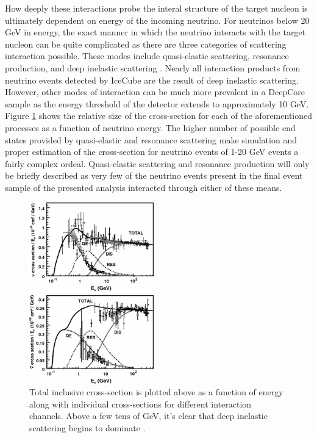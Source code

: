 \documentclass{gatech-thesis}
\begin{document}
How deeply these interactions probe the interal structure of the target nucleon is ultimately dependent on energy of the incoming neutrino. For neutrinos below 20 GeV in energy, the exact manner in which the neutrino interacts with the target nucleon can be quite complicated as there are three categories of scattering interaction possible. These modes include quasi-elastic scattering, resonance production, and deep inelastic scattering \cite{2012RvMP...84.1307F}. Nearly all interaction products from neutrino events detected by IceCube are the result of deep inelastic scattering. However, other modes of interaction can be much more prevalent in a DeepCore sample as the energy threshold of the detector extends to approximately 10 GeV. Figure \ref{fig:neutrino_scattering} shows the relative size of the cross-section for each of the aforementioned processes as a function of neutrino energy. The higher number of possible end states provided by quasi-elastic and resonance scattering make simulation and proper estimation of the cross-section for neutrino events of 1-20 GeV events a fairly complex ordeal. Quasi-elastic scattering and resonance production will only be briefly described as very few of the neutrino events present in the final event sample of the presented analysis interacted through either of these means.

\begin{figure}
  \begin{center}
    \includegraphics[width=0.48\textwidth,keepaspectratio]{neutrino_nucelon_crosssections.png}
  \end{center}
  \caption{Total inclusive cross-section is plotted above as a function of energy along with individual cross-sections for different interaction channels. Above a few tens of GeV, it's clear that deep inelastic scattering begins to dominate \cite{2012RvMP...84.1307F}.}
  \label{fig:neutrino_scattering}
\end{figure}
\end{document}
